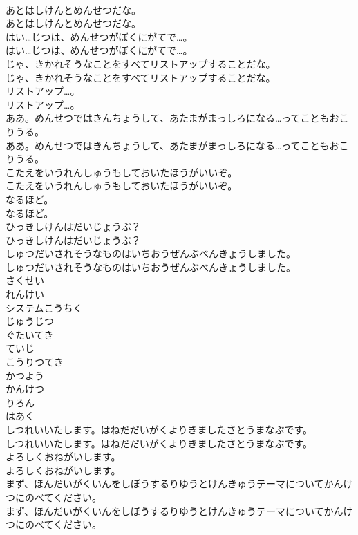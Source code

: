 \documentclass[8pt]{extreport}
\begin{document}
\begin{CJK}{UTF8}{min}
\\	あとはしけんとめんせつだな。
\\	あとはしけんとめんせつだな。
\\	はい…じつは、めんせつがぼくにがてで…。
\\	はい…じつは、めんせつがぼくにがてで…。
\\	じゃ、きかれそうなことをすべてリストアップすることだな。
\\	じゃ、きかれそうなことをすべてリストアップすることだな。
\\	リストアップ…。
\\	リストアップ…。
\\	ああ。めんせつではきんちょうして、あたまがまっしろになる…ってこともおこりうる。
\\	ああ。めんせつではきんちょうして、あたまがまっしろになる…ってこともおこりうる。
\\	こたえをいうれんしゅうもしておいたほうがいいぞ。
\\	こたえをいうれんしゅうもしておいたほうがいいぞ。
\\	なるほど。
\\	なるほど。
\\	ひっきしけんはだいじょうぶ？
\\	ひっきしけんはだいじょうぶ？
\\	しゅつだいされそうなものはいちおうぜんぶべんきょうしました。
\\	しゅつだいされそうなものはいちおうぜんぶべんきょうしました。
\\	さくせい
\\	れんけい
\\	システムこうちく
\\	じゅうじつ
\\	ぐたいてき
\\	ていじ
\\	こうりつてき
\\	かつよう
\\	かんけつ
\\	りろん
\\	はあく
\\	しつれいいたします。はねだだいがくよりきましたさとうまなぶです。
\\	しつれいいたします。はねだだいがくよりきましたさとうまなぶです。
\\	よろしくおねがいします。
\\	よろしくおねがいします。
\\	まず、ほんだいがくいんをしぼうするりゆうとけんきゅうテーマについてかんけつにのべてください。
\\	まず、ほんだいがくいんをしぼうするりゆうとけんきゅうテーマについてかんけつにのべてください。

\end{CJK}
\end{document}

